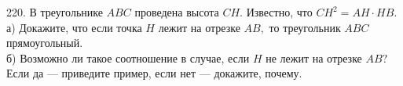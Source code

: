 220. В треугольнике $ABC$ проведена высота $CH.$ Известно, что $CH^2=AH\cdot HB.$\\
а) Докажите, что если точка $H$ лежит на отрезке $AB,$ то треугольник $ABC$ прямоугольный.\\
б) Возможно ли такое соотношение в случае, если $H$ не лежит на отрезке $AB?$ Если да --- приведите пример, если нет --- докажите, почему.\\
